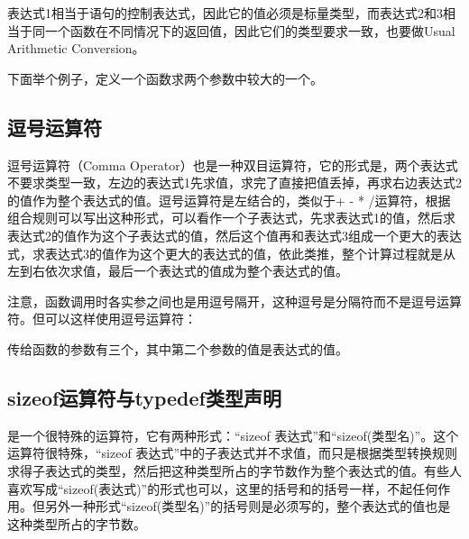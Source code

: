 表达式1相当于语句的控制表达式，因此它的值必须是标量类型，而表达式2和3相当于同一个函数在不同情况下的返回值，因此它们的类型要求一致，也要做Usual Arithmetic Conversion。



下面举个例子，定义一个函数求两个参数中较大的一个。



\subsection{逗号运算符}
%


逗号运算符（Comma Operator）也是一种双目运算符，它的形式是，两个表达式不要求类型一致，左边的表达式1先求值，求完了直接把值丢掉，再求右边表达式2的值作为整个表达式的值。逗号运算符是左结合的，类似于+ - * /运算符，根据组合规则可以写出这种形式，可以看作一个子表达式，先求表达式1的值，然后求表达式2的值作为这个子表达式的值，然后这个值再和表达式3组成一个更大的表达式，求表达式3的值作为这个更大的表达式的值，依此类推，整个计算过程就是从左到右依次求值，最后一个表达式的值成为整个表达式的值。



注意，函数调用时各实参之间也是用逗号隔开，这种逗号是分隔符而不是逗号运算符。但可以这样使用逗号运算符：




传给函数的参数有三个，其中第二个参数的值是表达式的值。


\subsection{sizeof运算符与typedef类型声明}
%


是一个很特殊的运算符，它有两种形式：“sizeof 表达式”和“sizeof(类型名)”。这个运算符很特殊，“sizeof 表达式”中的子表达式并不求值，而只是根据类型转换规则求得子表达式的类型，然后把这种类型所占的字节数作为整个表达式的值。有些人喜欢写成“sizeof(表达式)”的形式也可以，这里的括号和的括号一样，不起任何作用。但另外一种形式“sizeof(类型名)”的括号则是必须写的，整个表达式的值也是这种类型所占的字节数。



